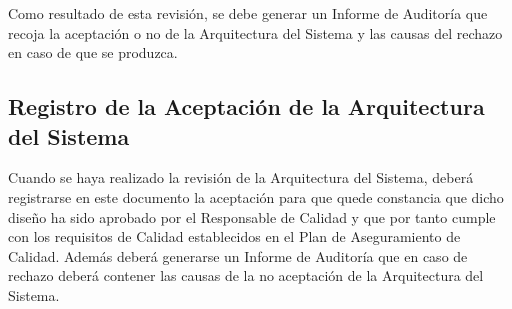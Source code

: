 \par Como resultado de esta revisión, se debe generar un Informe de Auditoría que recoja la aceptación o no de la Arquitectura del Sistema y las causas del rechazo en caso de que se produzca.

\subsection{Registro de la Aceptación de la Arquitectura del Sistema}
\par Cuando se haya realizado la revisión de la Arquitectura del Sistema, deberá registrarse en este documento la aceptación para que quede constancia que dicho diseño ha sido aprobado por el Responsable de Calidad y que por tanto cumple con los requisitos de Calidad establecidos en el Plan de Aseguramiento de Calidad. Además deberá generarse un Informe de Auditoría que en caso de rechazo deberá contener las causas de la no aceptación de la Arquitectura del Sistema.
